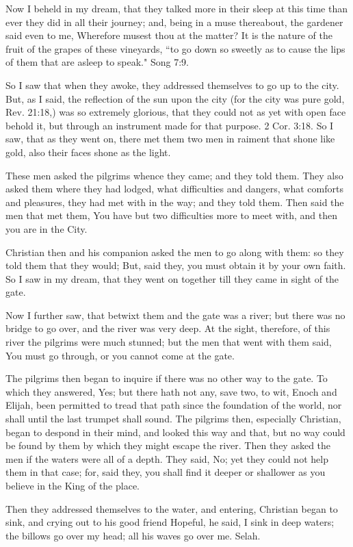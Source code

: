 Now I beheld in my dream, that they talked more in their sleep at this time than ever they did in all their journey; and, being in a muse thereabout, the gardener said even to me, Wherefore musest thou at the matter? It is the nature of the fruit of the grapes of these vineyards, ``to go down so sweetly as to cause the lips of them that are asleep to speak." Song 7:9.

So I saw that when they awoke, they addressed themselves to go up to the city. But, as I said, the reflection of the sun upon the city (for the city was pure gold, Rev. 21:18,) was so extremely glorious, that they could not as yet with open face behold it, but through an instrument made for that purpose. 2 Cor. 3:18. So I saw, that as they went on, there met them two men in raiment that shone like gold, also their faces shone as the light.

These men asked the pilgrims whence they came; and they told them. They also asked them where they had lodged, what difficulties and dangers, what comforts and pleasures, they had met with in the way; and they told them. Then said the men that met them, You have but two difficulties more to meet with, and then you are in the City.

Christian then and his companion asked the men to go along with them: so they told them that they would; But, said they, you must obtain it by your own faith. So I saw in my dream, that they went on together till they came in sight of the gate.

Now I further saw, that betwixt them and the gate was a river; but there was no bridge to go over, and the river was very deep. At the sight, therefore, of this river the pilgrims were much stunned; but the men that went with them said, You must go through, or you cannot come at the gate.

The pilgrims then began to inquire if there was no other way to the gate. To which they answered, Yes; but there hath not any, save two, to wit, Enoch and Elijah, been permitted to tread that path since the foundation of the world, nor shall until the last trumpet shall sound. The pilgrims then, especially Christian, began to despond in their mind, and looked this way and that, but no way could be found by them by which they might escape the river. Then they asked the men if the waters were all of a depth. They said, No; yet they could not help them in that case; for, said they, you shall find it deeper or shallower as you believe in the King of the place.

Then they addressed themselves to the water, and entering, Christian began to sink, and crying out to his good friend Hopeful, he said, I sink in deep waters; the billows go over my head; all his waves go over me. Selah.

